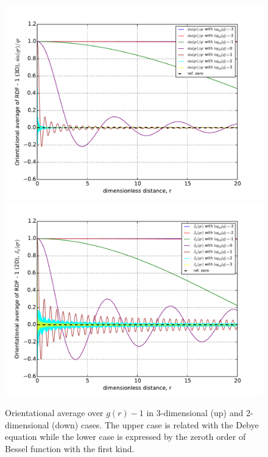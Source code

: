 \documentclass[10pt, a4paper]{report}
\begin{document}
\begin{appendices}
    \begin{figure}
      \centering
      \includegraphics[width=\textwidth]{figures/Debye_equation.pdf}\\
      \includegraphics[width=\textwidth]{figures/J_0_qr.pdf}
      \caption{Orientational average over $g(r)-1$ in 3-dimensional (up) and 2-dimensional (down) cases. The upper case is related with the Debye equation while the lower case is expressed by the zeroth order of Bessel function with the first kind.}
      \label{fig:iso_av_orientation}
    \end{figure}


\end{appendices}
\end{document}
